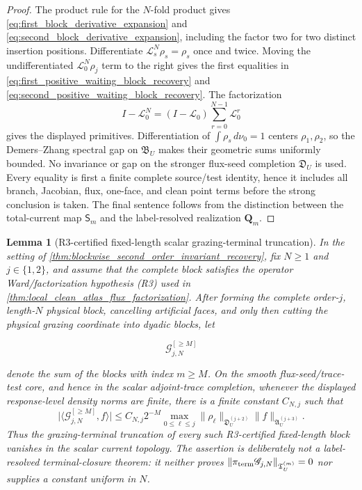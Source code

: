 \documentclass[11pt]{amsart}
\theoremstyle{compactplain}
\newtheorem{lemma}[theorem]{Lemma}
\theoremstyle{compactdefinition}
\theoremstyle{compactremark}
\newcommand{\Ltransfer}{\mathscr L}
\begin{document}
\begin{proof}
The product rule for the \(N\)-fold product gives
\eqref{eq:first_block_derivative_expansion} and
\eqref{eq:second_block_derivative_expansion}, including the factor two for
two distinct insertion positions.  Differentiate
\(\Ltransfer_s^N\rho_s=\rho_s\) once and twice.  Moving the undifferentiated
\(\Ltransfer_0^N\rho_j\) term to the right gives the first equalities in
\eqref{eq:first_positive_waiting_block_recovery} and
\eqref{eq:second_positive_waiting_block_recovery}.  The factorization
\[
 I-\Ltransfer_0^N=(I-\Ltransfer_0)
   \sum_{r=0}^{N-1}\Ltransfer_0^r
\]
gives the displayed primitives.  Differentiation of
\(\int\rho_s\,d\nu_0=1\) centers \(\rho_1,\rho_2\), so the Demers--Zhang
spectral gap on \(\mathfrak B_U\) makes their geometric sums uniformly
bounded.  No invariance or gap on the stronger flux-seed completion
\(\mathfrak D_U\) is used.  Every equality is first a
finite complete source/test identity, hence it includes all branch, Jacobian,
flux, one-face, and clean point terms before the strong conclusion is taken.
The final sentence follows from the distinction between the total-current map
\(\mathsf S_m\) and the label-resolved realization \(\mathbf Q_m\).
\end{proof}

\begin{lemma}[R3-certified fixed-length scalar grazing-terminal truncation]
\label{lem:fixed_length_scalar_terminal_truncation}
In the setting of
\cref{thm:blockwise_second_order_invariant_recovery}, fix \(N\ge1\) and
\(j\in\{1,2\}\), and assume that the complete block satisfies the
operator Ward/factorization hypothesis (R3) used in
\cref{thm:local_clean_atlas_flux_factorization}.  After forming the complete order-\(j\), length-\(N\)
physical block, cancelling artificial faces, and only then cutting the
physical grazing coordinate into dyadic blocks, let

\[
 \mathscr G_{j,N}^{[\ge M]}
\]

denote the sum of the blocks with index \(m\ge M\).  On the smooth
flux-seed/trace-test core, and hence in the scalar adjoint-trace completion,
whenever the displayed response-level density norms are finite, there is a
finite constant \(C_{N,j}\) such that
\begin{equation}
\label{eq:fixed_length_scalar_terminal_tail}
 \bigl|\langle \mathscr G_{j,N}^{[\ge M]},f\rangle\bigr|
 \le C_{N,j}2^{-M}
 \max_{0\le \ell\le j}
 \|\rho_\ell\|_{\mathfrak D_U^{(j+2)}}
 \|f\|_{\mathfrak A_U^{(j+3)}}.
\end{equation}
Thus the grazing-terminal truncation of every such R3-certified fixed-length block
vanishes in the scalar current topology.  The assertion is deliberately not
a label-resolved terminal-closure theorem: it neither proves
\(\|\pi_{\rm term}\mathscr G_{j,N}\|_{\mathfrak T_U^{(m)}}=0\) nor supplies a
constant uniform in \(N\).
\end{lemma}
\end{document}

